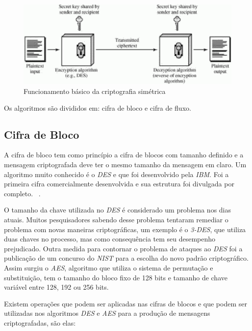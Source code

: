 \begin{figure}[h]
\centering
\includegraphics[scale=0.5]
{figuras/SymmetricCipher.eps}
\caption[Funcionamento básico da criptografia simétrica] {Funcionamento básico da criptografia simétrica\protect\footnotemark}
\end{figure}

Os algoritmos são divididos em: cifra de bloco e cifra de fluxo.

\subsection{Cifra de Bloco}
\label{block-cipher}

A cifra de bloco tem como princípio a cifra de blocos com tamanho definido e a mensagem criptografada deve ter o mesmo tamanho da mensagem em claro. Um algoritmo muito conhecido é o \textit{DES} e que foi desenvolvido pela \textit{IBM}. Foi a primeira cifra comercialmente desenvolvida e sua estrutura foi divulgada por completo. ~\cite{alex-biryukov}. 

O tamanho da chave utilizada no \textit{DES} é considerado um problema nos dias atuais. Muitos pesquisadores sabendo desse problema tentaram remediar o problema com novas maneiras criptográficas, um exemplo é o \textit{3-DES}, que utiliza duas chaves no processo, mas como consequência tem seu desempenho prejudicado. Outra medida para contornar o problema de ataques ao \textit{DES} foi a publicação de um concurso do \textit{NIST} para a escolha do novo padrão criptográfico. Assim surgiu o \textit{AES}, algoritmo que utiliza o sistema de permutação e substituição, tem o tamanho do bloco fixo de 128 bits e tamanho de chave variável entre 128, 192 ou 256 bits. 

Existem operações que podem ser aplicadas nas cifras de blocos e que podem ser utilizadas nos algoritmos \textit{DES} e \textit{AES} para a produção de mensagens criptografadas, são elas:

